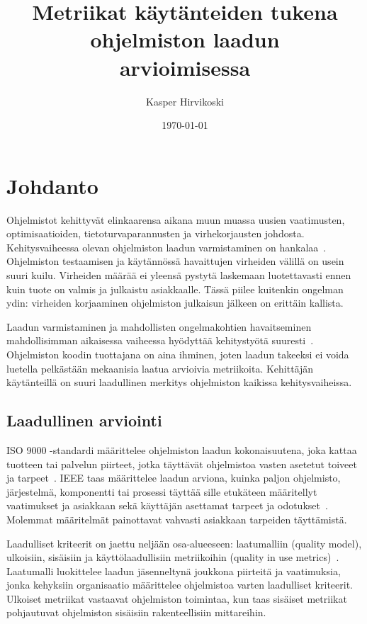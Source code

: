 \documentclass[finnish]{../tktltiki2}
\title{Metriikat käytänteiden tukena ohjelmiston laadun\\arvioimisessa}
\author{Kasper Hirvikoski}
\date{\today}
\theoremstyle{definition}
\theoremstyle{remark}
\begin{document}

\maketitle

\tableofcontents
\newpage


\section{Johdanto}

Ohjelmistot kehittyvät elinkaarensa aikana muun muassa uusien vaatimusten, optimisaatioiden, tietoturvaparannusten ja 
virhekorjausten johdosta. Kehitysvaiheessa olevan ohjelmiston laadun varmistaminen on 
hankalaa~\cite{NB05, NB07, ZN08, MNDT09}. Ohjelmiston testaamisen ja käytännössä havaittujen virheiden välillä on usein 
suuri kuilu. Virheiden määrää ei yleensä pystytä laskemaan luotettavasti ennen kuin tuote on valmis ja julkaistu 
asiakkaalle. Tässä piilee kuitenkin ongelman ydin: virheiden korjaaminen ohjelmiston julkaisun jälkeen on erittäin 
kallista.

    Laadun varmistaminen ja mahdollisten ongelmakohtien havaitseminen mahdollisimman aikaisessa vaiheessa hyödyttää 
kehitystyötä suuresti~\cite{NB05}. Ohjelmiston koodin tuottajana on aina ihminen, joten laadun takeeksi ei voida 
luetella pelkästään mekaanisia laatua arvioivia metriikoita. Kehittäjän käytänteillä on suuri laadullinen merkitys 
ohjelmiston kaikissa kehitysvaiheissa.

\subsection{Laadullinen arviointi}

ISO 9000 -standardi määrittelee ohjelmiston laadun kokonaisuutena, joka kattaa tuotteen tai palvelun piirteet, jotka 
täyttävät ohjelmistoa vasten asetetut toiveet ja tarpeet~\cite{ISO9000}. IEEE taas määrittelee laadun arviona, kuinka 
paljon ohjelmisto, järjestelmä, komponentti tai prosessi täyttää sille etukäteen määritellyt vaatimukset ja asiakkaan 
sekä käyttäjän asettamat tarpeet ja odotukset~\cite{IEEE1074}. Molemmat määritelmät painottavat vahvasti asiakkaan 
tarpeiden täyttämistä.

    Laadulliset kriteerit on jaettu neljään osa-alueeseen: laatumalliin (quality model), ulkoisiin, sisäisiin ja 
käyttölaadullisiin metriikoihin (quality in use metrics)~\cite{ISO25010}. Laatumalli luokittelee laadun jäsenneltynä 
joukkona piirteitä ja vaatimuksia, jonka kehyksiin organisaatio määrittelee ohjelmistoa varten laadulliset kriteerit. 
Ulkoiset metriikat vastaavat ohjelmiston toimintaa, kun taas sisäiset metriikat pohjautuvat ohjelmiston sisäisiin 
rakenteellisiin mittareihin.
\end{document}

